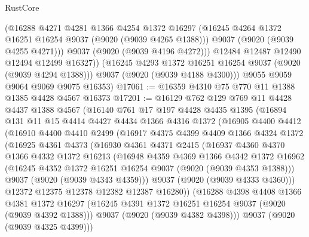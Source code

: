 \begin{lexlean}{RustCore}
\begin{coremodule}
              (@16288
                @4271
                @4281
                @1366
                @4254
                @1372
                @16297
                (@16245 @4264 @1372 @16251 @16254 @9037 (@9020 (@9039 @4265 @1388)))
                @9037
                (@9020 (@9039 @4255 @4271)))
              @9037
              (@9020 (@9039 @4196 @4272)))
            @12484
            @12487
            @12490
            @12494
            @12499
            @16327))
        (@16245 @4293 @1372 @16251 @16254 @9037 (@9020 (@9039 @4294 @1388)))
        @9037
        (@9020 (@9039 @4188 @4300)))
      @9055
      @9059
      @9064
      @9069
      @9075
      @16353)
@17061 := @16359 @4310 @75 @770 @11 @1388 @1385 @4428 @4567 @16373
@17201 := @16129
    @762
    @129
    @769
    @11
    @4428
    @4437
    @1388
    @4567
    (@16140
      @761
      @17
      @197
      @4428
      @4435
      @1395
      (@16894
        @131
        @11
        @15
        @4414
        @4427
        @4434
        @1366
        @4316
        @1372
        (@16905
          @4400
          @4412
          (@16910
            @4400
            @4410
            @2499
            (@16917
              @4375
              @4399
              @4409
              @1366
              @4324
              @1372
              (@16925
                @4361
                @4373
                (@16930
                  @4361
                  @4371
                  @2415
                  (@16937
                    @4360
                    @4370
                    @1366
                    @4332
                    @1372
                    @16213
                    (@16948
                      @4359
                      @4369
                      @1366
                      @4342
                      @1372
                      @16962
                      (@16245 @4352 @1372 @16251 @16254 @9037 (@9020 (@9039 @4353 @1388)))
                      @9037
                      (@9020 (@9039 @4343 @4359)))
                    @9037
                    (@9020 (@9039 @4333 @4360)))
                  @12372
                  @12375
                  @12378
                  @12382
                  @12387
                  @16280))
              (@16288
                @4398
                @4408
                @1366
                @4381
                @1372
                @16297
                (@16245 @4391 @1372 @16251 @16254 @9037 (@9020 (@9039 @4392 @1388)))
                @9037
                (@9020 (@9039 @4382 @4398)))
              @9037
              (@9020 (@9039 @4325 @4399)))

\end{coremodule}
\end{lexlean}
